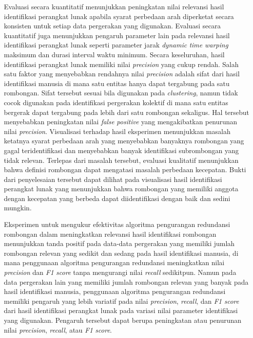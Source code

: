 Evaluasi secara kuantitatif menunjukkan peningkatan nilai relevansi hasil identifikasi perangkat lunak apabila syarat perbedaan arah diperketat secara konsisten untuk setiap data pergerakan yang digunakan. Evaluasi secara kuantitatif juga menunjukkan pengaruh parameter lain pada relevansi hasil identifikasi perangkat lunak seperti parameter jarak \textit{dynamic time warping} maksimum dan durasi interval waktu minimum. Secara keseluruhan, hasil identifikasi perangkat lunak memiliki nilai \textit{precision} yang cukup rendah. Salah satu faktor yang menyebabkan rendahnya nilai \textit{precision} adalah sifat dari hasil identifikasi manusia di mana satu entitas hanya dapat tergabung pada satu rombongan. Sifat tersebut sesuai bila digunakan pada \textit{clustering}, namun tidak cocok digunakan pada identifikasi pergerakan kolektif di mana satu entitas bergerak dapat tergabung pada lebih dari satu rombongan sekaligus. Hal tersebut menyebabkan peningkatan nilai \textit{false positive} yang mengakibatkan penurunan nilai \textit{precision}. Visualisasi terhadap hasil eksperimen menunjukkan masalah ketatnya syarat perbedaan arah yang menyebabkan banyaknya rombongan yang gagal teridentifikasi dan menyebabkan banyak identifikasi subrombongan yang tidak relevan. Terlepas dari masalah tersebut, evaluasi kualitatif menunjukkan bahwa definisi rombongan dapat mengatasi masalah perbedaan kecepatan. Bukti dari penyelesaian tersebut dapat dilihat pada visualisasi hasil identifikasi perangkat lunak yang menunjukkan bahwa rombongan yang memiliki anggota dengan kecepatan yang berbeda dapat diidentifikasi dengan baik dan sedini mungkin.

Eksperimen untuk mengukur efektivitas algoritma pengurangan redundansi rombongan dalam meningkatkan relevansi hasil identifikasi rombongan menunjukkan tanda positif pada data-data pergerakan yang memiliki jumlah rombongan relevan yang sedikit dan sedang pada hasil identifikasi manusia, di mana penggunaan algoritma pengurangan redundansi meningkatkan nilai \textit{precision} dan \textit{F1 score} tanpa mengurangi nilai \textit{recall} sedikitpun. Namun pada data pergerakan lain yang memiliki jumlah rombongan relevan yang banyak pada hasil identifikasi manusia, penggunaan algoritma pengurangan redundansi memiliki pengaruh yang lebih variatif pada nilai \textit{precision}, \textit{recall}, dan \textit{F1 score} dari hasil identifikasi perangkat lunak pada variasi nilai parameter identifikasi yang digunakan. Pengaruh tersebut dapat berupa peningkatan atau penurunan nilai \textit{precision}, \textit{recall}, atau \textit{F1 score}.

